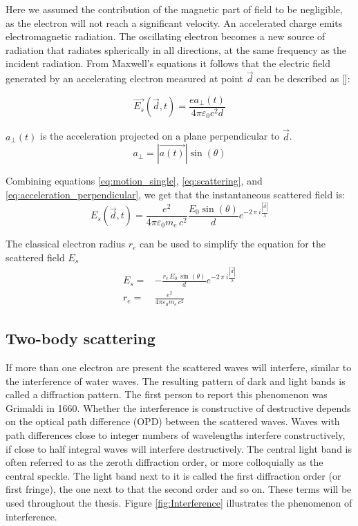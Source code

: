Here we assumed the contribution of the magnetic part of field to be negligible, as the electron will not reach a significant velocity.
An accelerated charge emits electromagnetic radiation. The oscillating electron becomes a new source of radiation that radiates spherically in all directions, at the same frequency as the incident radiation. From Maxwell's equations it follows that the electric field generated by an accelerating electron measured at point $\vec{d}$  can be described as []:

\begin{equation}\label{eq:scattering}
\vec{E_s}(\vec{d},t) = \frac{e a_\perp(t)}{4 \pi \varepsilon_0c^2d}
\end{equation}

$a_{\perp}(t)$ is the acceleration projected on a plane perpendicular to $\vec{d}$. 
\begin{equation}\label{eq:acceleration_perpendicular}
a_\perp = |\vec{a(t)}|\sin(\theta)
\end{equation}

Combining equations \ref{eq:motion_single}, \ref{eq:scattering}, and \ref{eq:acceleration_perpendicular}, we get that the instantaneous scattered field is:
\begin{equation}
E_s(\vec{d},t) = \frac{{e}^2}{4 \pi \varepsilon_0 m_e\,c^2} \frac{E_0 \sin(\theta)}{d} e^{-2\,\pi\ i \frac{|\vec{d}|}{\lambda}}
\end{equation}

The classical electron radius $r_e$ can be used to simplify the equation for the scattered field $E_s$
\begin{align*}
E_s=& - \frac{r_e\,E_0\,\sin(\theta)}{d} e^{-2\,\pi\ i \frac{|\vec{d}|}{\lambda}}\\
r_e =& \frac{e^2}{4 \pi \varepsilon_0 m_e\,c^2}    
\end{align*}


\subsection{Two-body scattering}
If more than one electron are present the scattered waves will interfere, similar to the interference of water waves. The resulting pattern of dark and light bands is called a diffraction pattern. The first person to report this phenomenon was Grimaldi in 1660. Whether the interference is constructive of destructive depends on the optical path difference (OPD) between the scattered waves. Waves with path differences close to integer numbers of wavelengths interfere constructively, if close to half integral waves will interfere destructively. The central light band is often referred to as the zeroth diffraction order, or more colloquially as the central speckle. The light band next to it is called the first diffraction order (or first fringe), the one next to that the second order and so on. These terms will be used throughout the thesis. Figure \ref{fig:Interference} illustrates the phenomenon of interference.

